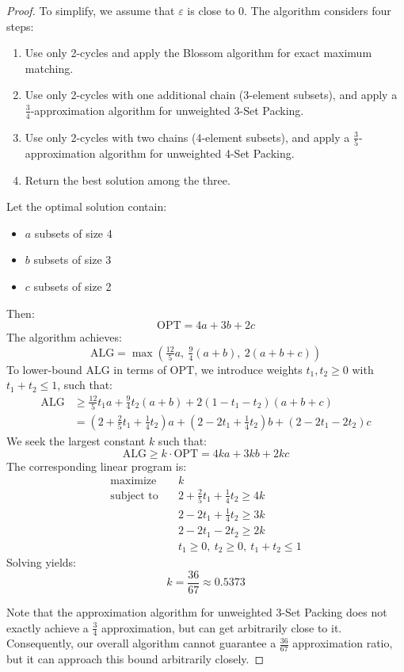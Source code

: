 \begin{proof}
To simplify, we assume that $\varepsilon$ is close to $0$. The algorithm considers four steps:
\begin{enumerate}
    \item Use only 2-cycles and apply the Blossom algorithm for exact maximum matching.
    \item Use only 2-cycles with one additional chain (3-element subsets), and apply a $\frac{3}{4}$-approximation algorithm for unweighted 3-Set Packing.
    \item Use only 2-cycles with two chains (4-element subsets), and apply a $\frac{3}{5}$-approximation algorithm for unweighted 4-Set Packing.
    \item Return the best solution among the three.
\end{enumerate}

Let the optimal solution contain:
\begin{itemize}
    \item $a$ subsets of size 4
    \item $b$ subsets of size 3
    \item $c$ subsets of size 2
\end{itemize}
Then:
\[
\mathrm{OPT} = 4a + 3b + 2c
\]
The algorithm achieves:
\[
\mathrm{ALG} = \max\left(\tfrac{12}{5} a,\ \tfrac{9}{4}(a + b),\ 2(a + b + c)\right)
\]
To lower-bound $\mathrm{ALG}$ in terms of $\mathrm{OPT}$, we introduce weights $t_1, t_2 \ge 0$ with $t_1 + t_2 \le 1$, such that:
\[
\begin{aligned}
    \mathrm{ALG} &\ge \tfrac{12}{5} t_1 a + \tfrac{9}{4} t_2 (a + b) + 2(1 - t_1 - t_2)(a + b + c) \\
    &= \left(2 + \tfrac{2}{5} t_1 + \tfrac{1}{4} t_2\right) a
    + \left(2 - 2t_1 + \tfrac{1}{4} t_2\right) b
    + \left(2 - 2t_1 - 2t_2\right) c
\end{aligned}
\]
We seek the largest constant $k$ such that:
\[
\mathrm{ALG} \ge k \cdot \mathrm{OPT} = 4ka + 3kb + 2kc
\]
The corresponding linear program is:
\[
\begin{aligned}
\text{maximize} \quad & k \\
\text{subject to} \quad
& 2 + \tfrac{2}{5} t_1 + \tfrac{1}{4} t_2 \ge 4k \\
& 2 - 2t_1 + \tfrac{1}{4} t_2 \ge 3k \\
& 2 - 2t_1 - 2t_2 \ge 2k \\
& t_1 \ge 0,\ t_2 \ge 0,\ t_1 + t_2 \le 1
\end{aligned}
\]
Solving yields:
\[
\boxed{k = \frac{36}{67} \approx 0.5373}
\]

Note that the approximation algorithm for unweighted 3-Set Packing does not exactly achieve a $\frac{3}{4}$ approximation, but can get arbitrarily close to it. Consequently, our overall algorithm cannot guarantee a $\frac{36}{67}$ approximation ratio, but it can approach this bound arbitrarily closely.

\end{proof}

